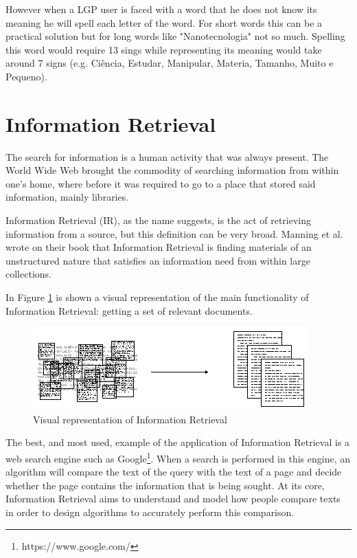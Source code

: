 However when a \gls{LGP} user is faced with a word that he does not know its meaning he will spell each letter of the word.
For short words this can be a practical solution but for long words like "Nanotecnologia" not so much.
Spelling this word would require 13 sings while representing its meaning would take around 7 signs (e.g. Ciência, Estudar, Manipular, Materia, Tamanho, Muito e Pequeno).

\section{Information Retrieval}

The search for information is a human activity that was always present.
The World Wide Web brought the commodity of searching information from within one's home, where before it was required to go to a place that stored said information, mainly libraries.

Information Retrieval (IR), as the name suggests, is the act of retrieving information from a source, but this definition can be very broad.
Manning et al.\cite{manning2008introduction} wrote on their book that Information Retrieval is finding materials of an unstructured nature that satisfies an information need from within large collections.

In Figure \ref{fig:iret} is shown a visual representation of the main functionality of Information Retrieval: getting a set of relevant documents.
\begin{figure}[H]
\centering
\includegraphics[scale=0.65]{ch2/assets/retrieve.png}
    \caption[InformationRetrival]{Visual representation of Information Retrieval\cite{gate2019}}
\label{fig:iret}
\end{figure}

The best, and most used, example of the application of Information Retrieval is a web search engine such as Google\footnote{https://www.google.com/}.
When a search is performed in this engine, an algorithm will compare the text of the query with the text of a page and decide whether the page contains the information that is being sought.
At its core, Information Retrieval aims to understand and model how people compare texts in order to design algorithms to accurately perform this comparison\cite{croft2010search}.


